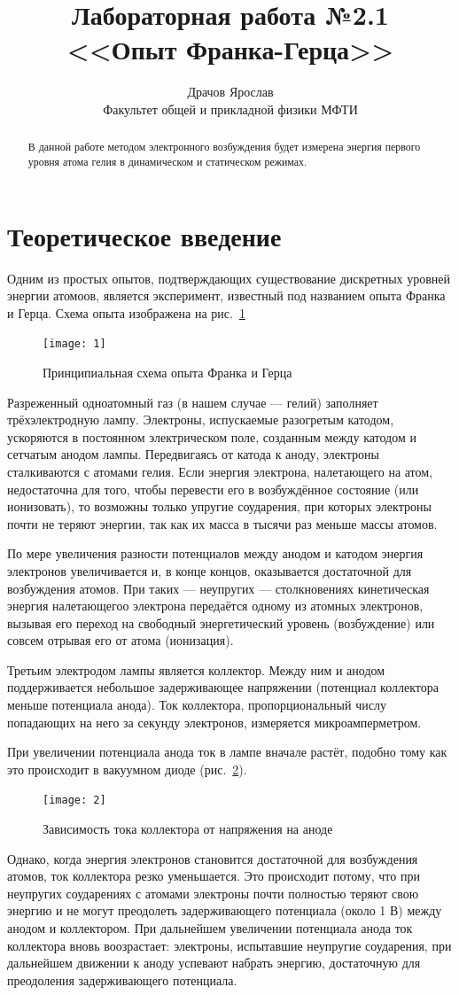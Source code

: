 \documentclass[a4paper]{article}
\title{Лабораторная работа №2.1\\  <<Опыт Франка-Герца>>}
\author{Драчов Ярослав \\ Факультет общей и прикладной физики МФТИ}
\begin{document}
\maketitle
\begin{abstract}
	В данной работе методом электронного возбуждения будет
	измерена энергия первого уровня атома гелия в динамическом
	и статическом режимах.
\end{abstract}
\section{Теоретическое введение}
Одним из простых опытов, подтверждающих существование дискретных
уровней энергии атомоов, является эксперимент, известный под
названием опыта Франка и Герца. Схема опыта изображена на рис.~\ref{fig:1}
\begin{figure}[ht]
	\centering
	\texttt{[image: 1]}
	\caption{Принципиальная схема опыта Франка и Герца}
	\label{fig:1}
\end{figure}

Разреженный одноатомный газ (в нашем случае --- гелий) заполняет
трёхэлектродную лампу. Электроны, испускаемые разогретым
катодом, ускоряются в постоянном электрическом поле, созданным
между катодом и сетчатым анодом лампы. Передвигаясь от катода
к аноду, электроны сталкиваются с атомами гелия. Если энергия
электрона, налетающего на атом, недостаточна для того, чтобы
перевести его в возбуждённое состояние (или ионизовать), то
возможны только упругие соударения, при которых электроны
почти не теряют энергии, так как их масса в тысячи раз меньше
массы атомов.

По мере увеличения разности потенциалов между анодом и катодом
энергия электронов увеличивается и, в конце концов, оказывается
достаточной для возбуждения атомов. При таких --- неупругих ---
столкновениях кинетическая энергия налетающегоо электрона
передаётся одному из атомных электронов, вызывая его переход
на свободный энергетический уровень (возбуждение) или
совсем отрывая его от атома (ионизация).

Третьим электродом лампы является коллектор. Между ним и анодом
поддерживается небольшое задерживающее напряжении (потенциал
коллектора меньше потенциала анода). Ток коллектора, пропорциональный
числу попадающих на него за секунду электронов, измеряется
микроамперметром.

При увеличении потенциала анода ток в лампе вначале
растёт, подобно тому как это происходит в вакуумном диоде (рис.~\ref{fig:2}).
\begin{figure}[ht]
	\centering
	\texttt{[image: 2]}
	\caption{Зависимость тока коллектора от напряжения на аноде}
	\label{fig:2}
\end{figure}Однако, когда энергия электронов становится достаточной
 для возбуждения атомов, ток коллектора резко уменьшается. Это
происходит  потому, что при неупругих соударениях с атомами электроны
почти полностью теряют свою энергию и не могут преодолеть
задерживающего потенциала (около 1 В) между анодом и коллектором.
При дальнейшем увеличении потенциала анода ток коллектора
вновь воозрастает: электроны, испытавшие неупругие соударения, при
дальнейшем движении к аноду
успевают набрать энергию, достаточную для преодоления задерживающего
потенциала.
\end{document}
